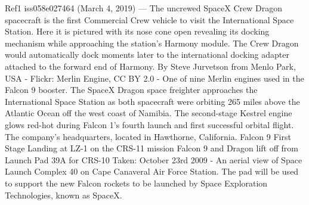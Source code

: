 \documentclass[letterpaper,10pt,english]{sphinxmanual}
\begin{document}
\begin{sphinxthebibliography}{Ref1}
iss058e027464 (March 4, 2019) — The uncrewed SpaceX Crew Dragon spacecraft is the first Commercial Crew vehicle to visit the International Space Station. Here it is pictured with its nose cone open revealing its docking mechanism while approaching the station’s Harmony module. The Crew Dragon would automatically dock moments later to the international docking adapter attached to the forward end of Harmony.
By Steve Jurvetson from Menlo Park, USA - Flickr: Merlin Engine, CC BY 2.0 - One of nine Merlin engines used in the Falcon 9 booster.
 The SpaceX Dragon space freighter approaches the International Space Station as both spacecraft were orbiting 265 miles above the Atlantic Ocean off the west coast of Namibia.
The second-stage Kestrel engine glows red-hot during Falcon 1’s fourth launch and first successful orbital flight.
The company’s headquarters, located in Hawthorne, California.
Falcon 9 First Stage Landing at LZ-1 on the CRS-11 mission
Falcon 9 and Dragon lift off from Launch Pad 39A for CRS-10
Taken: October 23rd 2009 - An aerial view of Space Launch Complex 40 on Cape Canaveral Air Force Station. The pad will be used to support the new Falcon rockets to be launched by Space Exploration Technologies, known as SpaceX.
\end{sphinxthebibliography}



\renewcommand{\indexname}{Index}
\printindex
\end{document}

